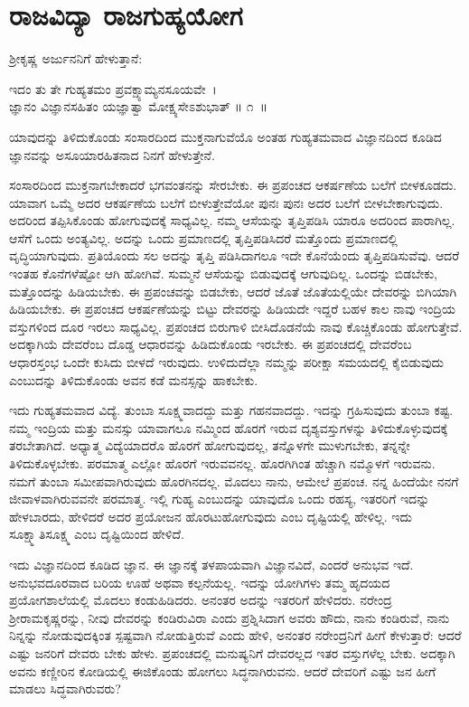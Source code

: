 
\chapter{ರಾಜವಿದ್ಯಾ ರಾಜಗುಹ್ಯಯೋಗ}

ಶ‍್ರೀಕೃಷ್ಣ ಅರ್ಜುನನಿಗೆ ಹೇಳುತ್ತಾನೆ:

\begin{shloka}
ಇದಂ ತು ತೇ ಗುಹ್ಯತಮಂ ಪ್ರವಕ್ಷ್ಯಾಮ್ಯನಸೂಯವೇ~।\\ಜ್ಞಾನಂ ವಿಜ್ಞಾನಸಹಿತಂ ಯಜ್ಞಾತ್ವಾ ಮೋಕ್ಷ್ಯಸೇಽಶುಭಾತ್ \hfill॥ ೧~॥
\end{shloka}

\begin{artha}
ಯಾವುದನ್ನು ತಿಳಿದುಕೊಂಡು ಸಂಸಾರದಿಂದ ಮುಕ್ತನಾಗುವೆಯೊ ಅಂತಹ ಗುಹ್ಯತಮವಾದ ವಿಜ್ಞಾನದಿಂದ ಕೂಡಿದ ಜ್ಞಾನವನ್ನು ಅಸೂಯಾರಹಿತನಾದ ನಿನಗೆ ಹೇಳುತ್ತೇನೆ.
\end{artha}

ಸಂಸಾರದಿಂದ ಮುಕ್ತನಾಗಬೇಕಾದರೆ ಭಗವಂತನನ್ನು ಸೇರಬೇಕು. ಈ ಪ್ರಪಂಚದ ಆಕರ್ಷ\-ಣೆಯ ಬಲೆಗೆ ಬೀಳಕೂಡದು. ಯಾವಾಗ ಒಮ್ಮೆ ಅದರ ಆಕರ್ಷಣೆಯ ಬಲೆಗೆ ಬೀಳುತ್ತೇವೆಯೋ ಪುನಃ ಪುನಃ ಅದರ ಬಲೆಗೆ ಬೀಳಬೇಕಾಗುವುದು. ಅದರಿಂದ ತಪ್ಪಿಸಿಕೊಂಡು ಹೋಗುವುದಕ್ಕೆ ಸಾಧ್ಯವಿಲ್ಲ. ನಮ್ಮ ಆಸೆಯನ್ನು ತೃಪ್ತಿಪಡಿಸಿ ಯಾರೂ ಅದರಿಂದ ಪಾರಾಗಿಲ್ಲ. ಆಸೆಗೆ ಒಂದು ಅಂತ್ಯವಿಲ್ಲ. ಅದನ್ನು ಒಂದು ಪ್ರಮಾಣದಲ್ಲಿ ತೃಪ್ತಿಪಡಿಸಿದರೆ ಮತ್ತೊಂದು ಪ್ರಮಾಣದಲ್ಲಿ ವೃದ್ಧಿಯಾಗುವುದು. ಪ್ರತಿಯೊಂದು ಸಲ ಅದನ್ನು ತೃಪ್ತಿ ಪಡಿಸಿದಾಗಲೂ ಇದೇ ಕೊನೆಯೆಂದು ತೃಪ್ತಿಪಡಿಸುವೆವು. ಆದರೆ ಇಂತಹ ಕೊನೆಗಳೆಷ್ಟೋ ಆಗಿ ಹೋಗಿವೆ. ಸುಮ್ಮನೆ ಆಸೆಯನ್ನು ಬಿಡುವುದಕ್ಕೆ ಆಗುವುದಿಲ್ಲ. ಒಂದನ್ನು ಬಿಡಬೇಕು, ಮತ್ತೊಂದನ್ನು ಹಿಡಿಯಬೇಕು. ಈ ಪ್ರಪಂಚವನ್ನು ಬಿಡಬೇಕು, ಆದರೆ ಜೊತೆ ಜೊತೆಯಲ್ಲಿಯೇ ದೇವರನ್ನು ಬಿಗಿಯಾಗಿ ಹಿಡಿಯಬೇಕು. ಈ ಪ್ರಪಂಚದ ಆಕರ್ಷಣೆಯನ್ನು ಬಿಟ್ಟು ದೇವರನ್ನು ಹಿಡಿಯದೇ ಇದ್ದರೆ ಬಹಳ ಕಾಲ ನಾವು ಇಂದ್ರಿಯ ವಸ್ತುಗಳಿಂದ ದೂರ ಇರಲು ಸಾಧ್ಯವಿಲ್ಲ. ಪ್ರಪಂಚದ ಬಿರುಗಾಳಿ ಬೀಸಿದೊಡನೆಯೆ ನಾವು ಕೊಚ್ಚಿಕೊಂಡು ಹೋಗುತ್ತೇವೆ. ಅದಕ್ಕಾಗಿಯೆ ದೇವರೆಂಬ ದೊಡ್ಡ ಆಧಾರವನ್ನು ಹಿಡಿದುಕೊಂಡು ಇರಬೇಕು. ಈ ಪ್ರಪಂಚದಲ್ಲಿ ದೇವರೆಂಬ ಆಧಾರಸ್ತಂಭ ಒಂದೇ ಕುಸಿದು ಬೀಳದೆ ಇರುವುದು. ಉಳಿದುದೆಲ್ಲಾ ನಮ್ಮನ್ನು ಪರೀಕ್ಷಾ ಸಮಯದಲ್ಲಿ ಕೈಬಿಡುವುದು ಎಂಬುದನ್ನು ತಿಳಿದುಕೊಂಡು ಅವನ ಕಡೆ ಮನಸ್ಸನ್ನು ಹಾಕಬೇಕು.

ಇದು ಗುಹ್ಯತಮವಾದ ವಿದ್ಯೆ. ತುಂಬಾ ಸೂಕ್ಷ್ಮವಾದದ್ದು ಮತ್ತು ಗಹನವಾದದ್ದು. ಇದನ್ನು ಗ್ರಹಿಸುವುದು ತುಂಬಾ ಕಷ್ಟ. ನಮ್ಮ ಇಂದ್ರಿಯ ಮತ್ತು ಮನಸ್ಸು ಯಾವಾಗಲೂ ನಮ್ಮಿಂದ ಹೊರಗೆ ಇರುವ ದೃಶ್ಯವಸ್ತುಗಳನ್ನು ತಿಳಿದುಕೊಳ್ಳುವುದಕ್ಕೆ ತರಬೇತಾಗಿದೆ. ಅಧ್ಯಾತ್ಮ ವಿದ್ಯೆಯಾದರೊ ಹೊರಗೆ ಹೋಗುವುದಲ್ಲ, ತನ್ನೊಳಗೇ ಮುಳುಗಬೇಕು, ತನ್ನನ್ನೇ ತಿಳಿದುಕೊಳ್ಳಬೇಕು. ಪರಮಾತ್ಮ ಎಲ್ಲೋ ಹೊರಗೆ ಇರುವವನಲ್ಲ. ಹೊರಗಿಗಿಂತ ಹೆಚ್ಚಾಗಿ ನಮ್ಮೊಳಗೆ ಇರುವನು. ನಮಗೆ ತುಂಬಾ ಸಮೀಪವಾಗಿರುವುದು ಹೊರಗಿನದಲ್ಲ. ಮೊದಲು ನಾನು, ಆಮೇಲೆ ಪ್ರಪಂಚ. ನನ್ನ ಹಿಂದೆಯೇ ನನಗೆ ಜೀವಾಳವಾಗಿರುವವನೇ ಪರಮಾತ್ಮ. ಇಲ್ಲಿ ಗುಹ್ಯ ಎಂಬುದನ್ನು ಯಾವುದೊ ಒಂದು ರಹಸ್ಯ, ಇತರರಿಗೆ ಇದನ್ನು ಹೇಳಬಾರದು, ಹೇಳಿದರೆ ಅದರ ಪ್ರಯೋಜನ ಹೊರಟುಹೋಗುವುದು ಎಂಬ ದೃಷ್ಟಿಯಲ್ಲಿ ಹೇಳಿಲ್ಲ. ಇದು ಸೂಕ್ಷ್ಮಾತಿಸೂಕ್ಷ್ಮ ಎಂಬ ದೃಷ್ಟಿಯಿಂದ ಹೇಳಿದೆ.

ಇದು ವಿಜ್ಞಾನದಿಂದ ಕೂಡಿದ ಜ್ಞಾನ. ಈ ಜ್ಞಾನಕ್ಕೆ ತಳಪಾಯವಾಗಿ ವಿಜ್ಞಾನವಿದೆ, ಎಂದರೆ ಅನುಭವ ಇದೆ. ಅನುಭವದೂರವಾದ ಬರಿಯ ಊಹೆ ಅಥವಾ ಕಲ್ಪನೆಯಲ್ಲ. ಇದನ್ನು ಯೋಗಿಗಳು ತಮ್ಮ ಹೃದಯದ ಪ್ರಯೋಗಶಾಲೆಯಲ್ಲಿ ಮೊದಲು ಕಂಡುಹಿಡಿದರು. ಅನಂತರ ಅದನ್ನು ಇತರರಿಗೆ ಹೇಳಿದರು. ನರೇಂದ್ರ ಶ‍್ರೀರಾಮಕೃಷ್ಣರನ್ನು, ನೀವು ದೇವರನ್ನು ಕಂಡಿರುವಿರಾ ಎಂದು ಪ್ರಶ್ನಿಸಿದಾಗ ಅವರು ಹೌದು, ನಾನು ಕಂಡಿರುವೆ, ನಾನು ನಿನ್ನನ್ನು ನೋಡುವುದಕ್ಕಿಂತ ಸ್ಪಷ್ಟವಾಗಿ ನೋಡುತ್ತಿರುವೆ ಎಂದು ಹೇಳಿ, ಅನಂತರ ನರೇಂದ್ರನಿಗೆ ಹೀಗೆ ಕೇಳುತ್ತಾರೆ: ಆದರೆ ಎಷ್ಟು ಜನರಿಗೆ ದೇವರು ಬೇಕು ಹೇಳು. ಪ್ರಪಂಚದಲ್ಲಿ ಮನುಷ್ಯನಿಗೆ ದೇವರಲ್ಲದ ಇತರ ವಸ್ತುಗಳೆಲ್ಲ ಬೇಕು. ಅದಕ್ಕಾಗಿ ಅವನು ಕಣ್ಣೀರಿನ ಕೋಡಿಯಲ್ಲಿ ಈಜಿಕೊಂಡು ಹೋಗಲು ಸಿದ್ಧನಾಗಿರುವನು. ಆದರೆ ದೇವರಿಗೆ ಎಷ್ಟು ಜನ ಹೀಗೆ ಮಾಡಲು ಸಿದ್ಧವಾಗಿರುವರು?

